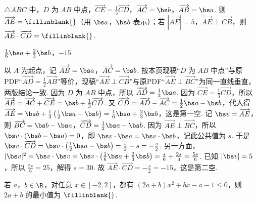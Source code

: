 \begin{problem}
\(\triangle ABC\) 中，\(D\) 为 \(AB\) 中点，\(\overrightarrow{CE}=\frac13\overrightarrow{CD}\)，\(\overrightarrow{AC}= \bs b\)，\(\overrightarrow{AB}=\bs a\).
则 \(\overrightarrow{AE}=\fillinblank{}\)（用 \(\bs a\)，\(\bs b\) 表示）；若 \(|\overrightarrow{AE}|=5\)，\(\overrightarrow{AE}\perp\overrightarrow{CB}\)，则 \(\overrightarrow{AE}\cdot\overrightarrow{CD}=\fillinblank{}\).

\end{problem}

\begin{answer}
\(\frac16\bs a+\frac23\bs b\)，\(-15\)
\end{answer}

\begin{solution}
以 \(A\) 为起点，记 \(\overrightarrow{AB}=\bs a\)，\(\overrightarrow{AC}=\bs b\). 按本页现稿“\(D\) 为 \(AB\) 中点”与原PDF“\(\overrightarrow{AD}=\frac12\overrightarrow{AB}\)”等价，现稿“\(\overrightarrow{AE}\perp\overrightarrow{CB}\)”与原PDF“\(\overrightarrow{AE}\perp\overrightarrow{BC}\)”为同一直线垂直，两版结论一致. 因为 \(D\) 为 \(AB\) 中点，所以 \(\overrightarrow{AD}=\frac12\bs a\). 因为 \(\overrightarrow{CE}=\frac13\overrightarrow{CD}\)，所以 \(\overrightarrow{AE}=\overrightarrow{AC}+\overrightarrow{CE}=\bs b+\frac13\overrightarrow{CD}\). 又 \(\overrightarrow{CD}=\overrightarrow{AD}-\overrightarrow{AC}=\frac12\bs a-\bs b\)，代入得 \(\overrightarrow{AE}=\bs b+\frac13\left(\frac12\bs a-\bs b\right)=\frac16\bs a+\frac23\bs b\)，这是第一空. 记 \(\bs v=\overrightarrow{AE}\)，则 \(\overrightarrow{BC}=\bs b-\bs a\)，\(\overrightarrow{CD}=\frac12\bs a-\bs b\). 因为 \(\overrightarrow{AE}\perp \overrightarrow{BC}\)，所以 \(\bs v\cdot(\bs b-\bs a)=0\)，即 \(\bs v\cdot\bs a=\bs v\cdot\bs b\)，记此公共值为 \(s\). 于是 \(\bs v\cdot\overrightarrow{CD}=\bs v\cdot\left(\frac12\bs a-\bs b\right)=\frac{s}{2}-s=-\frac{s}{2}\). 另一方面，\(|\bs v|^{2}=\bs v\cdot\bs v=\bs v\cdot\left(\frac16\bs a+\frac23\bs b\right)=\frac{s}{6}+\frac{2s}{3}=\frac{5s}{6}\). 已知 \(|\bs v|=5\)，所以 \(\frac{5s}{6}=25\)，解得 \(s=30\). 故 \(\overrightarrow{AE}\cdot\overrightarrow{CD}=-\frac{s}{2}=-15\)，这是第二空.
\end{solution}

\begin{problem}
若 \(a\)，\(b\in\R\)，对任意 \(x\in[-2,2]\)，都有 \((2a+b)x^2+bx-a-1\le0\)，则 \(2a+b\) 的最小值为 \(\fillinblank{}\).
\end{problem}

